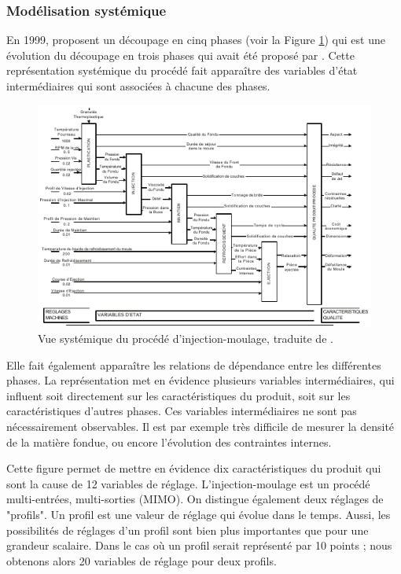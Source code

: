 \subsubsection{Modélisation systémique} \label{subsubsec:molding_systemic}
En 1999, \citeauthor{kazmer_towards_1999} proposent un découpage en cinq phases \cite{kazmer_towards_1999} (voir la Figure \ref{fig:kazmer_systematic}) qui est une évolution du découpage en trois phases qui avait été proposé par \citeauthor{ma_design_1974} \cite{ma_design_1974}.
Cette représentation systémique du procédé fait apparaître des variables d’état intermédiaires qui sont associées à chacune des phases.

\begin{figure}[bthp]
	\centering
	\includegraphics[width=\textwidth,height=\textheight,keepaspectratio]{../Chap1/Figures/Kazmer_1999-Process.pdf}
	\caption[Vue systémique du procédé d'injection-moulage.]{Vue systémique du procédé d'injection-moulage, traduite de \citeauthor{kazmer_towards_1999} \cite{kazmer_towards_1999}.}
	\label{fig:kazmer_systematic}
\end{figure}

Elle fait également apparaître les relations de dépendance entre les différentes phases.
La représentation met en évidence plusieurs variables intermédiaires, qui influent soit directement sur les caractéristiques du produit, soit sur les caractéristiques d'autres phases.
Ces variables intermédiaires ne sont pas nécessairement observables.
Il est par exemple très difficile de mesurer la densité de la matière fondue, ou encore l'évolution des contraintes internes.

Cette figure permet de mettre en évidence dix caractéristiques du produit qui sont la cause de 12 variables de réglage.
L'injection-moulage est un procédé multi-entrées, multi-sorties (MIMO).
On distingue également deux réglages de "profils".
Un profil est une valeur de réglage qui évolue dans le temps.
Aussi, les possibilités de réglages d'un profil sont bien plus importantes que pour une grandeur scalaire. Dans le cas où un profil serait représenté par 10 points ; nous obtenons alors 20 variables de réglage pour deux profils.


